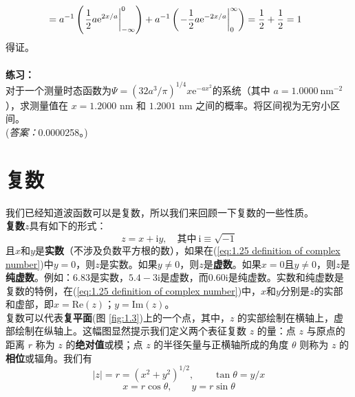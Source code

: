 \begin{examplebox}
\begin{equation*}
\begin{aligned}
				& = a^{-1}\left(\eval{\frac{1}{2}a\mathrm{e}^{2x/a}}_{-\infty}^{0}\right) + a^{-1}\left(\eval{-\frac{1}{2}a\mathrm{e}^{-2x/a}}_{0}^{\infty}\right) = \frac{1}{2} + \frac{1}{2} = 1 
			\end{aligned}
		\end{equation*}
		得证。\\
		\\
		\noindent \textbf{练习：}\\
		对于一个测量时态函数为$\Psi = \left(32 a^3 /\pi \right)^{1/4} x \mathrm{e}^{-ax^2}$的系统（其中 $a = 1.0000 \: \text{nm}^{-2}$），求测量值在 $x = 1.2000$ nm 和 $1.2001$ nm 之间的概率。将区间视为无穷小区间。\\
		(\textit{答案：}0.0000258。)
	\end{examplebox}
	
	\section{复数}
	我们已经知道波函数可以是复数，所以我们来回顾一下复数的一些性质。\\
	\indent \textbf{复数}$z$具有如下的形式：
	\begin{equation}
		z = x+\mathrm{i}y, \quad \text{其中} \: \mathrm{i}  \equiv \sqrt{-1}
		\label{eq:1.25 definition of complex number}
	\end{equation}
	且$x$和$y$是\textbf{实数}（不涉及负数平方根的数），如果在(\ref{eq:1.25 definition of complex number})中$y=0$，则$z$是实数。如果$y \neq 0$，则$z$是\textbf{虚数}。如果$x=0$且$y \neq 0$，则$z$是\textbf{纯虚数}。例如：6.83是实数，$5.4-3\mathrm{i}$是虚数，而$0.60\mathrm{i}$是纯虚数。实数和纯虚数是复数的特例，在(\ref{eq:1.25 definition of complex number})中，$x$和$y$分别是$z$的实部和虚部，即$x = \mathrm{Re} \left(z\right)$；$y = \mathrm{Im}\left(z\right)$。\\
	\indent 复数可以代表\textbf{复平面}(图 \ref{fig:1.3})上的一个点，其中，$z$ 的实部绘制在横轴上，虚部绘制在纵轴上。这幅图显然提示我们定义两个表征复数 $z$ 的量：点 $z$ 与原点的距离 $r$ 称为 $z$ 的\textbf{绝对值}或模；点 $z$ 的半径矢量与正横轴所成的角度 $\theta$ 则称为 $z$ 的\textbf{相位}或辐角。我们有
	\begin{equation}
		\left|z\right| = r = \left(x^2+y^2\right)^{1/2}, \qquad \tan \theta = y/x
		\label{eq:1.26 definition of phase and absolute value}
	\end{equation}
	\begin{equation*}
		x = r \cos \theta, \qquad y = r \sin \theta
	\end{equation*}
